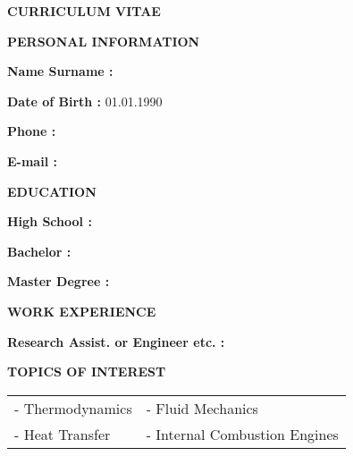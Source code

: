 \begin{center}
    \Large\textbf{CURRICULUM VITAE} 
\end{center}
\vspace{-5mm} 

\bigskip \par

\noindent
\parbox[t]{8cm}{\normalsize\textbf{PERSONAL INFORMATION} \vspace{2mm} 

\textbf{Name Surname :} \Author \par  
\textbf{Date of Birth :} 01.01.1990   \par
\textbf{Phone :} \par
\textbf{E-mail :} \par}
     \hfill


\bigskip \par

\parbox[t]{17cm}{
\normalsize\textbf{EDUCATION} \vspace{2mm}

\textbf{High School :} \par
\textbf{Bachelor :} \par
\textbf{Master Degree :}
}

\bigskip \par

\parbox[t]{17cm}{
\normalsize\textbf{WORK EXPERIENCE} \vspace{2mm}

\textbf{Research Assist. or Engineer etc. :} \par
}
\bigskip \par
\normalsize\textbf{TOPICS OF INTEREST} \par
\medskip \par
\begin{tabular}{ p{8cm} p{8cm} }
	- Thermodynamics  & - Fluid Mechanics \\
	- Heat Transfer  & - Internal Combustion Engines\\
\end{tabular}



